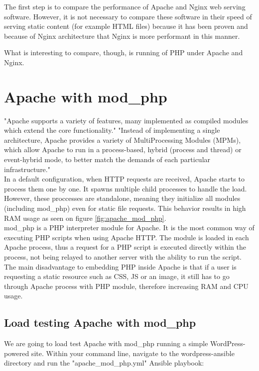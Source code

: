The first step is to compare the performance of Apache and Nginx web serving software. However, it is not necessary to compare these software in their speed of serving static content (for example HTML files) because it has been proven and because of Nginx architecture that Nginx is more performant in this manner.

What is interesting to compare, though, is running of PHP under Apache and Nginx.

\section{Apache with mod\_php}

"Apache supports a variety of features, many implemented as compiled modules which extend the core functionality." "Instead of implementing a single architecture, Apache provides a variety of MultiProcessing Modules (MPMs), which allow Apache to run in a process-based, hybrid (process and thread) or event-hybrid mode, to better match the demands of each particular infrastructure." \cite{Apache:Wiki}\\

In a default configuration, when HTTP requests are received, Apache starts to process them one by one. It spawns multiple child processes to handle the load. However, these proccesses are standalone, meaning they initialize all modules (including mod\_php) even for static file requests. This behavior results in high RAM usage as seen on figure \ref{fig:apache_mod_php}. \\

mod\_php is a PHP interpreter module for Apache. It is the most common way of executing PHP scripts when using Apache HTTP. The module is loaded in each Apache process, thus a request for a PHP script is executed directly within the process, not being relayed to another server with the ability to run the script. The main disadvantage to embedding PHP inside Apache is that if a user is requesting a static resource such as CSS, JS or an image, it still has to go through Apache process with PHP module, therefore increasing RAM and CPU usage.

\subsection{Load testing Apache with mod\_php}

We are going to load test Apache with mod\_php running a simple WordPress-powered site. Within your command line, navigate to the wordpress-ansible directory and run the "apache\_mod\_php.yml" Ansible playbook:


